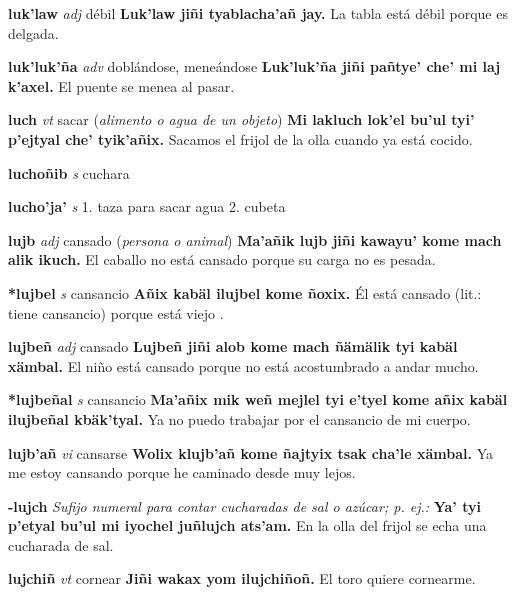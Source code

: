 \documentclass[10pt]{scrbook}
\newcommand{\entry}[1]{\textbf{#1}}
\newcommand{\onedefinition}[1]{#1.}
\newcommand{\nontranslationdef}[1]{\textit{#1}}
\newcommand{\partofspeech}[1]{\textit{#1}}
\newcommand{\spanishtranslation}[1]{#1}
\newcommand{\clarification}[1]{(\textit{#1})}
\newcommand{\cholexample}[1]{\textbf{#1}}
\newcommand{\exampletranslation}[1]{#1}
\begin{document}
\begin{multicols}{2}
\entry{luk'law}
\partofspeech{adj}
\spanishtranslation{débil}
\cholexample{Luk'law jiñi tyablacha'añ jay.}
\exampletranslation{La tabla está débil porque es delgada.}

\entry{luk'luk'ña}
\partofspeech{adv}
\spanishtranslation{doblándose, meneándose}
\cholexample{Luk'luk'ña jiñi pañtye' che' mi laj k'axel.}
\exampletranslation{El puente se menea al pasar.}

\entry{luch}
\partofspeech{vt}
\spanishtranslation{sacar}
\clarification{alimento o agua de un objeto}
\cholexample{Mi lakluch lok'el bu'ul tyi' p'ejtyal che' tyik'añix.}
\exampletranslation{Sacamos el frijol de la olla cuando ya está cocido.}

\entry{luchoñib}
\partofspeech{s}
\spanishtranslation{cuchara}

\entry{lucho'ja'}
\partofspeech{s}
\onedefinition{1}
\spanishtranslation{taza para sacar agua}
\onedefinition{2}
\spanishtranslation{cubeta}

\entry{lujb}
\partofspeech{adj}
\spanishtranslation{cansado}
\clarification{persona o animal}
\cholexample{Ma'añik lujb jiñi kawayu' kome mach alik ikuch.}
\exampletranslation{El caballo no está cansado porque su carga no es pesada.}

\entry{*lujbel}
\partofspeech{s}
\spanishtranslation{cansancio}
\cholexample{Añix kabäl ilujbel kome ñoxix.}
\exampletranslation{Él está cansado (lit.: tiene cansancio) porque está viejo .}

\entry{lujbeñ}
\partofspeech{adj}
\spanishtranslation{cansado}
\cholexample{Lujbeñ jiñi alob kome mach ñämälik tyi kabäl xämbal.}
\exampletranslation{El niño está cansado porque no está acostumbrado a andar mucho.}

\entry{*lujbeñal}
\partofspeech{s}
\spanishtranslation{cansancio}
\cholexample{Ma'añix mik weñ mejlel tyi e'tyel kome añix kabäl ilujbeñal kbäk'tyal.}
\exampletranslation{Ya no puedo trabajar por el cansancio de mi cuerpo.}

\entry{lujb'añ}
\partofspeech{vi}
\spanishtranslation{cansarse}
\cholexample{Wolix klujb'añ kome ñajtyix tsak cha'le xämbal.}
\exampletranslation{Ya me estoy cansando porque he caminado desde muy lejos.}

\entry{-lujch}
\nontranslationdef{Sufijo numeral para contar cucharadas de sal o azúcar; p. ej.:}
\cholexample{Ya' tyi p'etyal bu'ul mi iyochel juñlujch ats'am.}
\exampletranslation{En la olla del frijol se echa una cucharada de sal.}

\entry{lujchiñ}
\partofspeech{vt}
\spanishtranslation{cornear}
\cholexample{Jiñi wakax yom ilujchiñoñ.}
\exampletranslation{El toro quiere cornearme.}


\end{multicols}
\end{document}
